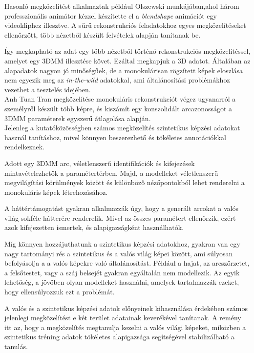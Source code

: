 \documentclass[12pt,a4]{article}
\begin{document}
	
	Hasonló megközelítést alkalmaztak például Olszewski \cite{olszewski} munkájában,ahol három professzionális animátor kézzel készítette el a \textit{blendshape} animációt egy videokliphez illesztve. A sűrű rekonstrukciós feladatokhoz egyes megközelítéseket ellenőrzött, több nézetből készült felvételek alapján tanítanak be.
	
	
	Így megkapható az adat egy több nézetből történő rekonstrukciós megközelítéssel, amelyet egy 3DMM illesztése követ. Ezáltal  megkapjuk a 3D adatot. Általában az alapadatok nagyon jó minőségűek,
	de a monokulárisan rögzített képek eloszlása nem
	egyezik meg az \textit{in-the-wild} adatokkal, ami általánosítási problémákhoz vezethet
	a tesztelés idejében.\\
	
	
	Anh Tuan Tran megközelítése monokuláris rekonstrukciót végez ugyanarról a személyről készült több képre, és kiszámít egy konszolidált arcazonosságot a 3DMM paraméterek egyszerű átlagolása alapján. \\
	
	
	Jelenleg a kutatóközösségben számos megközelítés szintetikus képzési adatokat használ tanításhoz, mivel könnyen beszerezhető és tökéletes annotációkkal rendelkeznek. 
	
	
	Adott egy 3DMM arc, véletlenszerű identifikációk és kifejezések mintavételezhetők a paramétertérben. 
	Majd,
	a modelleket véletlenszerű megvilágítási körülmények között és különböző nézőpontokból lehet renderelni a monokuláris képek létrehozásához. 
	
	
	A háttértámogatást gyakran alkalmazzák úgy, hogy a generált arcokat a valós világ sokféle hátterére renderelik. Mivel az összes paramétert ellenőrzik, ezért azok kifejezetten ismertek, és alapigazságként használhatók.
	
	
	Míg könnyen hozzájuthatunk a szintetikus képzési adatokhoz, gyakran van egy nagy tartományi rés
	a szintetikus és a valós világ képei között, ami súlyosan befolyásolja a
	a valós képekre való általánosítást. Például a hajat, az arcszőrzetet, a felsőtestet,
	vagy a száj belsejét gyakran egyáltalán nem modellezik. Az egyik lehetőség,
	a jövőben olyan modelleket használni, amelyek tartalmazzák ezeket, hogy ellensúlyozzuk ezt a problémát. 
	
	
	A valós és a szintetikus képzési adatok előnyeinek kihasználása érdekében számos jelenlegi megközelítést e két terület adatainak keverékével tanítanak. A remény itt az, hogy a megközelítés megtanulja kezelni a valós világi
	képeket, miközben a szintetikus tréning adatok tökéletes alapigazsága
	segítségével stabilizálható a tanulás.\\
\end{document}
